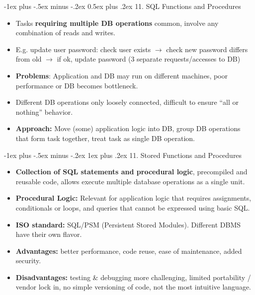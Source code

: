 \documentclass[12pt, landscape]{article}
\makeatletter
\renewcommand{\section}{\@startsection{section}{1}{0mm}%
                                {-1ex plus -.5ex minus -.2ex}%
                                {0.5ex plus .2ex}%
                                {\normalfont\large\bfseries}}
\renewcommand{\subsubsection}{\@startsection{subsubsection}{3}{0.1mm}%
                                {-1ex plus -.5ex minus -.2ex}%
                                {1ex plus .2ex}%
                                {\normalfont\small\bfseries}}
\makeatother
\begin{document}
\begin{multicols*}{3}
\vfill \null
\columnbreak


\section{11. SQL Functions and Procedures}
\begin{itemize}
\item Tasks \textbf{requiring multiple DB operations} common, involve any combination of reads and writes. 
\item E.g. update user password: check user exists $\rightarrow$ check new password differs from old $\rightarrow$ if ok, update password (3 separate requests/accesses to DB)
\item \textbf{Problems}: Application and DB may run on different machines, poor performance or DB becomes bottleneck. 
\item Different DB operations only loosely connected, difficult to ensure ``all or nothing'' behavior.
\item \textbf{Approach:} Move (some) application logic into DB, group DB operations that form task together, treat task as single DB operation.
 \end{itemize}

\bigskip


\subsubsection{11. Stored Functions and Procedures}
\begin{itemize}
\item \textbf{Collection of SQL statements and procedural logic}, precompiled and reusable code, allows execute multiple database operations as a single unit.
\item \textbf{Procedural Logic:} Relevant for application logic that requires assignments, conditionals or loops, and queries that cannot be expressed using basic SQL.
\item \textbf{ISO standard:} SQL/PSM (Persistent Stored Modules). Different DBMS have their own flavor.
\item \textbf{Advantages:} better performance, code reuse, ease of maintenance, added security.
\item \textbf{Disadvantages:} testing \& debugging more challenging, limited portability / vendor lock in, no simple versioning of code, not the most intuitive language.
 \end{itemize}
 
 \vfill \null
 \columnbreak

\end{multicols*}
\end{document}
